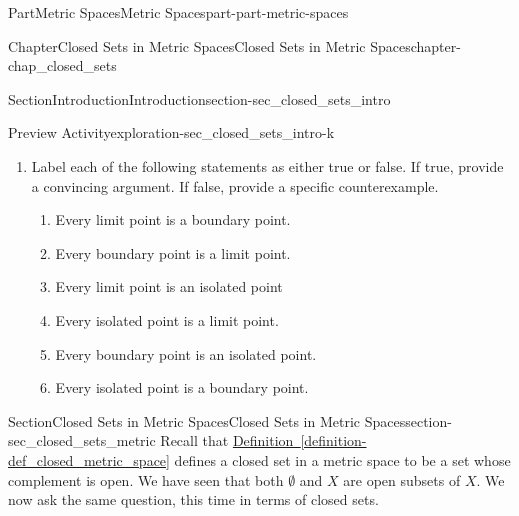 \documentclass[oneside,10pt,]{book}
\newcommand{\xreffont}{\relax}
\numberwithin{equation}{chapter}
\newcommand{\R}{\mathbb{R}}
\newcommand{\lt}{<}
\newcommand{\amp}{&}
\begin{document}
\begin{partptx}{Part}{Metric Spaces}{}{Metric Spaces}{}{}{part-part-metric-spaces}
\begin{chapterptx}{Chapter}{Closed Sets in Metric Spaces}{}{Closed Sets in Metric Spaces}{}{}{chapter-chap_closed_sets}
\begin{sectionptx}{Section}{Introduction}{}{Introduction}{}{}{section-sec_closed_sets_intro}
\begin{exploration}{Preview Activity}{}{exploration-sec_closed_sets_intro-k}
\begin{enumerate}[font=\bfseries,label=(\alph*),ref=\alph*]
\begin{enumerate}[font=\bfseries,label=(\roman*),ref=\theenumi.\roman*]%
\item{}\(X = \R\), \(d = d_E\), the Euclidean metric, \(A = [0,0.5)\).%
\item{}\(X = \{x \in \R \mid 0 \lt x \leq 1\}\), \(d = d_E\), the Euclidean metric, \(A = (0,0.5]\).%
\item{}\(X = \{a,b,c,e\}\), \(d\) is the discrete metric defined by%
\begin{equation*}
d(x,y) = \begin{cases}0 \amp \text{ if }  x = y \\ 1 \amp \text{ if }  x \neq y, \end{cases}
\end{equation*}
and \(A = \{a,b\}\).%
\end{enumerate}%
\item{}Label each of the following statements as either true or false. If true, provide a convincing argument. If false, provide a specific counterexample.%
\begin{enumerate}[font=\bfseries,label=(\roman*),ref=\theenumi.\roman*]%
\item{}Every limit point is a boundary point.%
\item{}Every boundary point is a limit point.%
\item{}Every limit point is an isolated point%
\item{}Every isolated point is a limit point.%
\item{}Every boundary point is an isolated point.%
\item{}Every isolated point is a boundary point.%
\end{enumerate}%
\end{enumerate}%
\end{exploration}%
\end{sectionptx}
%
%
\typeout{************************************************}
\typeout{************************************************}
%
\begin{sectionptx}{Section}{Closed Sets in Metric Spaces}{}{Closed Sets in Metric Spaces}{}{}{section-sec_closed_sets_metric}
Recall that \hyperref[definition-def_closed_metric_space]{Definition~{\xreffont\ref{definition-def_closed_metric_space}}} defines a closed set in a metric space to be a set whose complement is open. We have seen that both \(\emptyset\) and \(X\) are open subsets of \(X\). We now ask the same question, this time in terms of closed sets.%

\end{sectionptx}
\end{chapterptx}
\end{partptx}
\end{document}

